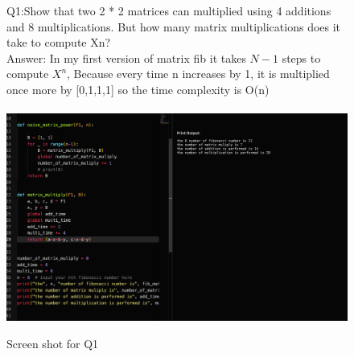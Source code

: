 \documentclass{article}
\begin{document}
\begin{enumerate}[label=(\alph*)]
    \begin{figure}[h]
    \item Q1:Show that two 2 * 2 matrices can multiplied using 4 additions and 8 multiplications.
    But how many matrix multiplications does it take to compute Xn?\\
    
    Answer: In my first version of matrix fib it takes $N-1$ steps to compute $X^n$, 
    Because every time n increases by 1, it is multiplied once more by [0,1,1,1]
    so the time complexity is O(n)\\
     \\
        
        \includegraphics[width=1.5\textwidth, inner]{ss for q1.png}
        \caption{Screen shot for Q1}
        \label{fig:figure1}
        \end{figure}
    


\end{enumerate}
\end{document}
